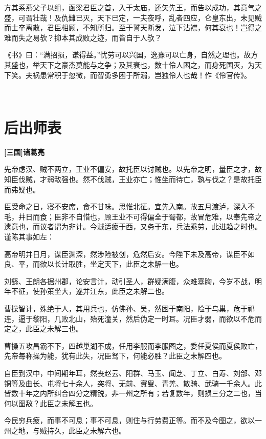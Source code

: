 \documentclass[UTF8,titlepage,oneside]{ctexbook}
\begin{document}
方其系燕父子以组，函梁君臣之首，入于太庙，还矢先王，而告以成功，其意气之盛，可谓壮哉！及仇雠已灭，天下已定，一夫夜呼，乱者四应，仑皇东出，未见贼而士卒离散，君臣相顾，不知所归。至于誓天断发，泣下沾襟，何其衰也！岂得之难而失之易欤？抑本其成败之迹，而皆自于人欤？


《书》曰：“满招损，谦得益。”忧劳可以兴国，逸豫可以亡身，自然之理也。故方其盛也，举天下之豪杰莫能与之争；及其衰也，数十伶人困之，而身死国灭，为天下笑。夫祸患常积于忽微，而智勇多困于所溺，岂独伶人也哉！作《伶官传》。


 



\chapter*{后出师表}
\begin{center}
	\textbf{[三国]诸葛亮}
\end{center}

先帝虑汉、贼不两立，王业不偏安，故托臣以讨贼也。以先帝之明，量臣之才，故知臣伐贼，才弱敌强也。然不伐贼，王业亦亡；惟坐而待亡，孰与伐之？是故托臣而弗疑也。


臣受命之日，寝不安席，食不甘味。思惟北征。宜先入南。故五月渡泸，深入不毛，并日而食；臣非不自惜也，顾王业不可得偏全于蜀都，故冒危难，以奉先帝之遗意也，而议者谓为非计。今贼适疲于西，又务于东，兵法乘劳，此进趋之时也。谨陈其事如左：


高帝明并日月，谋臣渊深，然涉险被创，危然后安。今陛下未及高帝，谋臣不如良、平，而欲以长计取胜，坐定天下，此臣之未解一也。


刘繇、王朗各据州郡，论安言计，动引圣人，群疑满腹，众难塞胸，今岁不战，明年不征，使孙策坐大，遂并江东，此臣之未解二也。


曹操智计，殊绝于人，其用兵也，仿佛孙、吴，然困于南阳，险于乌巢，危于祁连，逼于黎阳，几败北山，殆死潼关，然后伪定一时耳。况臣才弱，而欲以不危而定之，此臣之未解三也。


曹操五攻昌霸不下，四越巢湖不成，任用李服而李服图之，委任夏侯而夏侯败亡，先帝每称操为能，犹有此失，况臣驽下，何能必胜？此臣之未解四也。


自臣到汉中，中间期年耳，然丧赵云、阳群、马玉、阎芝、丁立、白寿、刘郃、邓铜等及曲长、屯将七十余人，突将、无前、賨叟、青羌、散骑、武骑一千余人。此皆数十年之内所纠合四分之精锐，非一州之所有；若复数年，则损三分之二也，当何以图敌？此臣之未解五也。


今民穷兵疲，而事不可息；事不可息，则住与行劳费正等。而不及今图之，欲以一州之地，与贼持久，此臣之未解六也。
\end{document}
